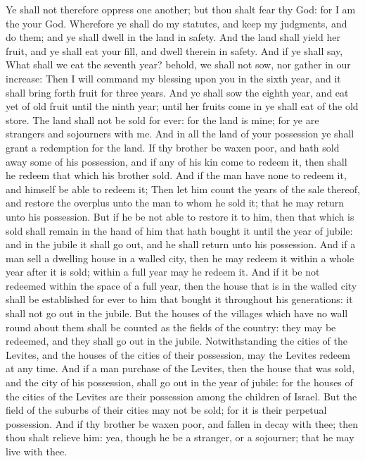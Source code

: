 \begin{biblechapter}
\verse Ye shall not therefore oppress one another; but thou shalt fear thy God: for I am the \LORD your God.
\verse Wherefore ye shall do my statutes, and keep my judgments, and do them; and ye shall dwell in the land in safety.
\verse And the land shall yield her fruit, and ye shall eat your fill, and dwell therein in safety.
\verse And if ye shall say, What shall we eat the seventh year? behold, we shall not sow, nor gather in our increase:
\verse Then I will command my blessing upon you in the sixth year, and it shall bring forth fruit for three years.
\verse And ye shall sow the eighth year, and eat yet of old fruit until the ninth year; until her fruits come in ye shall eat of the old store.
\verse The land shall not be sold for ever: for the land is mine; for ye are strangers and sojourners with me.
\verse And in all the land of your possession ye shall grant a redemption for the land.
\verse If thy brother be waxen poor, and hath sold away some of his possession, and if any of his kin come to redeem it, then shall he redeem that which his brother sold.
\verse And if the man have none to redeem it, and himself be able to redeem it;
\verse Then let him count the years of the sale thereof, and restore the overplus unto the man to whom he sold it; that he may return unto his possession.
\verse But if he be not able to restore it to him, then that which is sold shall remain in the hand of him that hath bought it until the year of jubile: and in the jubile it shall go out, and he shall return unto his possession.
\verse And if a man sell a dwelling house in a walled city, then he may redeem it within a whole year after it is sold; within a full year may he redeem it.
\verse And if it be not redeemed within the space of a full year, then the house that is in the walled city shall be established for ever to him that bought it throughout his generations: it shall not go out in the jubile.
\verse But the houses of the villages which have no wall round about them shall be counted as the fields of the country: they may be redeemed, and they shall go out in the jubile.
\verse Notwithstanding the cities of the Levites, and the houses of the cities of their possession, may the Levites redeem at any time.
\verse And if a man purchase of the Levites, then the house that was sold, and the city of his possession, shall go out in the year of jubile: for the houses of the cities of the Levites are their possession among the children of Israel.
\verse But the field of the suburbs of their cities may not be sold; for it is their perpetual possession.
\verse And if thy brother be waxen poor, and fallen in decay with thee; then thou shalt relieve him: yea, though he be a stranger, or a sojourner; that he may live with thee.

\end{biblechapter}
